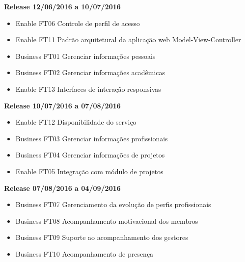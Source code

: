 \textbf{Release 12/06/2016 a 10/07/2016}
\begin{itemize}
    \item Enable FT06 Controle de perfil de acesso
    \item Enable FT11 Padrão arquitetural da aplicação web Model-View-Controller
    \item Business FT01 Gerenciar informações pessoais
    \item Business FT02 Gerenciar informações acadêmicas
    \item Enable FT13 Interfaces de interação responsivas
\end{itemize}
\textbf{Release 10/07/2016 a 07/08/2016}
\begin{itemize}
    \item Enable FT12 Disponibilidade do serviço
    \item Business FT03 Gerenciar informações profissionais
    \item Business FT04 Gerenciar informações de projetos
    \item Enable FT05 Integração com módulo de projetos
\end{itemize}
\textbf{Release 07/08/2016 a 04/09/2016}
\begin{itemize}
    \item Business FT07 Gerenciamento da evolução de perfis profissionais
    \item Business FT08 Acompanhamento motivacional dos membros
    \item Business FT09 Suporte ao acompanhamento dos gestores
    \item Business FT10 Acompanhamento de presença
\end{itemize}
